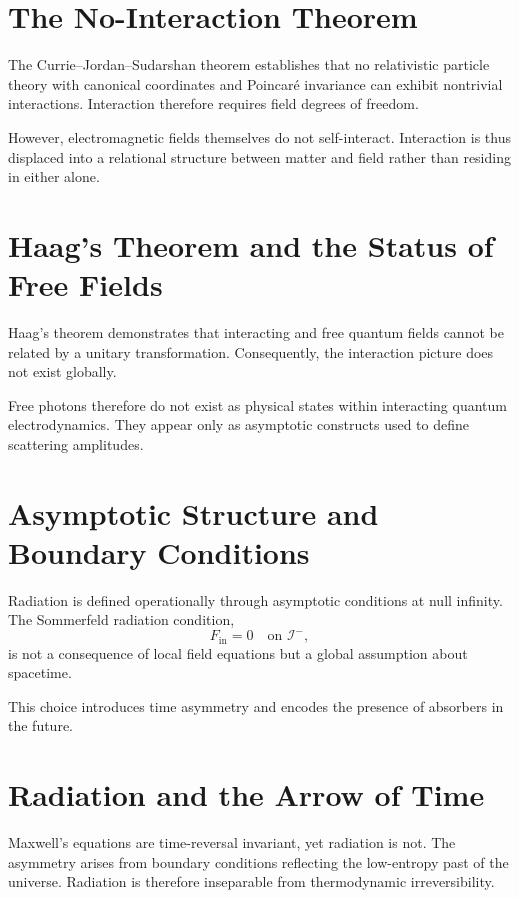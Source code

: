 \documentclass[11pt]{article}
\begin{document}
\section{The No-Interaction Theorem}

The Currie–Jordan–Sudarshan theorem \cite{Currie1963} establishes that no relativistic particle theory with canonical coordinates and Poincaré invariance can exhibit nontrivial interactions. Interaction therefore requires field degrees of freedom.

However, electromagnetic fields themselves do not self-interact. Interaction is thus displaced into a relational structure between matter and field rather than residing in either alone.

\section{Haag’s Theorem and the Status of Free Fields}

Haag’s theorem \cite{Haag1992} demonstrates that interacting and free quantum fields cannot be related by a unitary transformation. Consequently, the interaction picture does not exist globally.

Free photons therefore do not exist as physical states within interacting quantum electrodynamics. They appear only as asymptotic constructs used to define scattering amplitudes.

\section{Asymptotic Structure and Boundary Conditions}

Radiation is defined operationally through asymptotic conditions at null infinity. The Sommerfeld radiation condition,
\begin{equation}
F_{\text{in}} = 0 \quad \text{on } \mathcal{I}^-,
\end{equation}
is not a consequence of local field equations but a global assumption about spacetime.

This choice introduces time asymmetry and encodes the presence of absorbers in the future.

\section{Radiation and the Arrow of Time}

Maxwell’s equations are time-reversal invariant, yet radiation is not. The asymmetry arises from boundary conditions reflecting the low-entropy past of the universe. Radiation is therefore inseparable from thermodynamic irreversibility.
\end{document}
